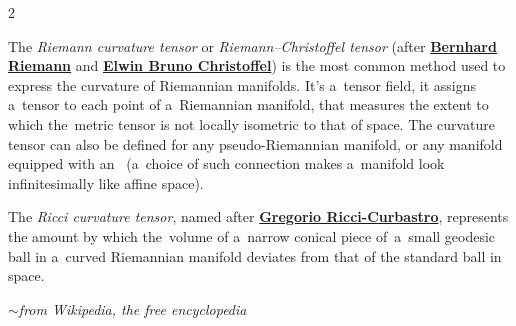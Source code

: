\begin{changemargin}{2\parindent}{\parindent}
\bgroup %
\setlength{\parindent}{\negparindent}
\setlength{\parskip}{0.8mm minus0.2mm}
\small

\leavevmode{\indent}The \emph{Riemann curvature tensor} or \emph{Riemann\hbox{--}Christoffel tensor} (after \href{https://en.wikipedia.org/wiki/Bernhard_Riemann}{\textbf{Bernhard Riemann}} and \href{https://en.wikipedia.org/wiki/Elwin_Bruno_Christoffel}{\textbf{Elwin Bruno Christoffel}}) is the most common method used to express the curvature of Riemannian manifolds. It’s a~tensor field, it assigns a~tensor to each point of a~Riemannian manifold, that measures the extent to which the~metric tensor is not locally isometric to that of  space. The curvature tensor can also be defined for any pseudo-Riemannian manifold, or any manifold equipped with an~ (a~choice of such connection makes a~manifold look infinitesimally like affine  space).

The \emph{Ricci curvature tensor}, named after \href{https://en.wikipedia.org/wiki/Gregorio_Ricci-Curbastro}{\textbf{Gregorio Ricci\hbox{-}Curbastro}}, represents the amount by which the~volume of a~narrow conical piece of~a~small geodesic ball in a~curved Riemannian manifold deviates from that of the standard ball in  space.

\vspace{.2em}
\hfill $\sim$\:\emph{from Wikipedia, the free encyclopedia}
\par
\egroup
\nopagebreak\vspace{.12em}
\end{changemargin}

